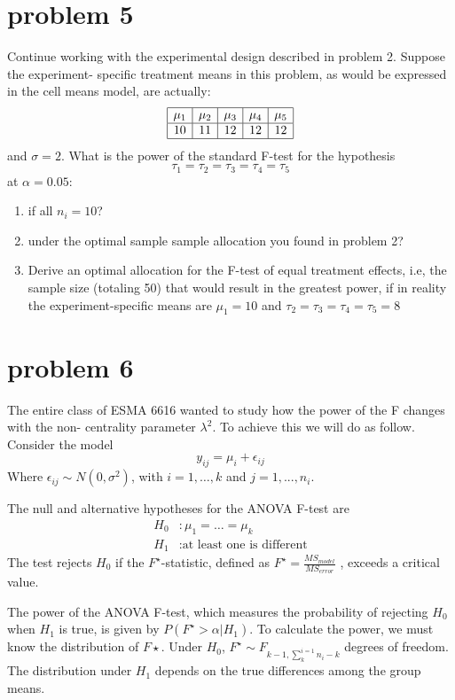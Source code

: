 \documentclass{article}
\begin{document}
\section{problem 5}
Continue working with the experimental design described in problem 2. Suppose the experiment-
specific treatment means in this problem, as would be expressed in the cell means model, are
actually:
$$
	\begin{array}{|c|c|c|c|c|}
		\hline
		\mu_1 & \mu_2 & \mu_3 & \mu_4 & \mu_5 \\
		\hline
		10    & 11    & 12    & 12    & 12    \\
		\hline
	\end{array}
$$
and $\sigma=2$. What is the power of the standard F-test for the hypothesis
$$
	\tau_1 = \tau_2 = \tau_3 = \tau_4 = \tau_5
$$
at $\alpha=0.05$:
\begin{enumerate}
	\item if all $n_i=10$?
	\item under the optimal sample sample allocation you found in problem 2?
	\item Derive an optimal allocation for the F-test of equal treatment effects, i.e, the sample size
	      (totaling 50) that would result in the greatest power, if in reality the experiment-specific means are
	      $\mu_1=10$ and $\tau_2 = \tau_3 = \tau_4 = \tau_5 =8$
\end{enumerate}

\section{problem 6}
The entire class of ESMA 6616 wanted to study how the power of the F changes with the non-
centrality parameter $\lambda^2$. To achieve this we will do as follow. Consider the model
$$
	y_{ij} = \mu_i + \epsilon_{ij}
$$
Where $\epsilon_{ij}\sim N(0,\sigma^2)$, with $i=1,\ldots,k$ and $j=1,...,n_i$.

The null and alternative hypotheses for the ANOVA F-test are
\[
	\begin{split}
		H_0 & : \mu_1 = \ldots = \mu_k           \\
		H_1 & : \text{at least one is different}
	\end{split}
\]
The test rejects $H_0$ if the $F^\star$-statistic, defined as $F^\star = \frac{MS_{model}}{MS_{error}}$ , exceeds
a critical value.

The power of the ANOVA F-test, which measures the probability of rejecting $H_0$ when $H_1$ is true, is
given by $P(F^\star > \alpha|H_1)$. To calculate the power, we must know the distribution
of $F\star$. Under $H_0$, $F^\star \sim F_{k-1,\sum_{k}^{i=1}n_i-k}$
degrees of freedom. The distribution under $H_1$ depends on
the true differences among the group means.
\end{document}
